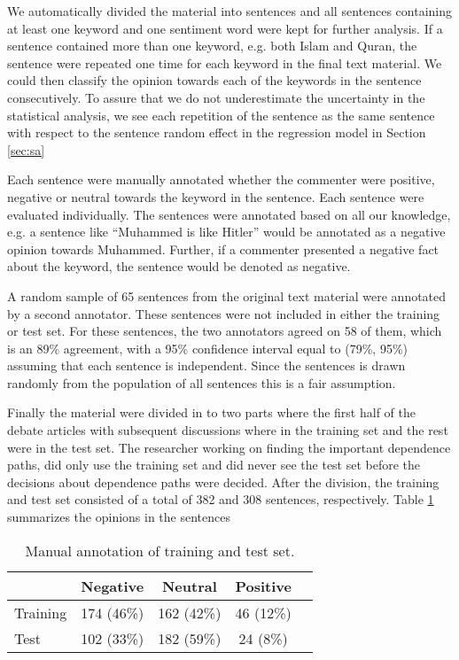 \documentclass[11pt]{article}
\begin{document}
We automatically divided the material into sentences and all sentences containing at least one keyword and one sentiment word were kept for further analysis. If a sentence contained more than one keyword, e.g. both Islam and Quran, the sentence were repeated one time for each keyword in the final text material. We could then classify the opinion towards each of the keywords in the sentence consecutively. To assure that we do not underestimate the uncertainty in the statistical analysis, we see each repetition of the sentence as the same sentence with respect to the sentence random effect in the regression model in Section \ref{sec:sa}

Each sentence were manually annotated whether the commenter were positive, negative or neutral towards the keyword in the sentence. Each sentence were evaluated individually. The sentences were annotated based on all our knowledge, e.g. a sentence like ``Muhammed is like Hitler'' would be annotated as a negative opinion towards Muhammed. Further, if a commenter presented a negative fact about the keyword, the sentence would be denoted as negative.

A random sample of 65 sentences from the original text material were annotated by a second annotator. These sentences were not included in either the training or test set. For these sentences, the two annotators agreed on 58 of them, which is an 89\% agreement, with a 95\% confidence interval equal to (79\%, 95\%) assuming that each sentence is independent. Since the sentences is drawn randomly from the population of all sentences this is a fair assumption.

Finally the material were divided in to two parts where the first half of the debate articles with subsequent discussions where in the training set and the rest were in the test set. The researcher working on finding the important dependence paths, did only use the training set and did never see the test set before the decisions about dependence paths were decided. After the division, the training and test set consisted of a total of 382 and 308 sentences, respectively. Table \ref{tab:1} summarizes the opinions in the sentences
\begin{table}
  \caption{Manual annotation of training and test set.}
  \centering
  \begin{tabular}{lcccc}
             & Negative & Neutral & Positive \\\hline
    Training & 174 (46\%) & 162 (42\%) & 46 (12\%)\\
    Test     & 102 (33\%)& 182 (59\%) & 24 (8\%)
  \end{tabular}
  \label{tab:1}
\end{table}
\end{document}
